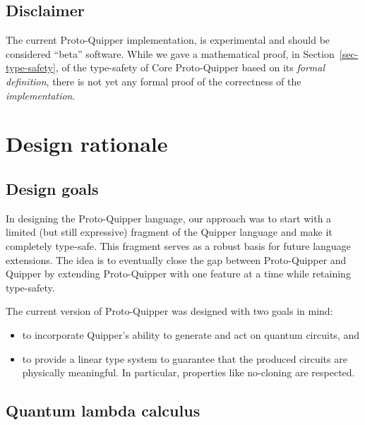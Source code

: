 \documentclass[twoside]{article}
\begin{document}
\subsection{Disclaimer}

The current Proto-Quipper implementation, is experimental and
should be considered ``beta'' software. While we gave a mathematical
proof, in Section~\ref{sec-type-safety}, of the type-safety of Core
Proto-Quipper based on its {\em formal definition}, there is not yet
any formal proof of the correctness of the {\em implementation}.

\clearpage
\section{Design rationale}\label{sec-design}

\subsection{Design goals}\label{ssec-goals}

In designing the Proto-Quipper language, our approach was to start
with a limited (but still expressive) fragment of the Quipper language
and make it completely type-safe.  This fragment serves as a robust
basis for future language extensions. The idea is to eventually close
the gap between Proto-Quipper and Quipper by extending Proto-Quipper
with one feature at a time while retaining type-safety. 

The current version of Proto-Quipper was designed with two goals
in mind:
\begin{itemize}
  \item to incorporate Quipper's ability to generate and act on 
  quantum circuits, and 
\item to provide a linear type system to guarantee that the produced
  circuits are physically meaningful. In particular, properties like
  no-cloning are respected.
\end{itemize}

\subsection{Quantum lambda calculus}
\end{document}
